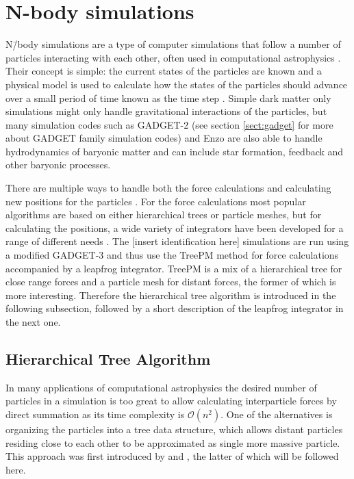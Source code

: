 \documentclass[english, oneside]{HYgradu}
\begin{document}
\section{N-body simulations}
N\=/body simulations are a type of computer simulations that follow a number of particles interacting with each other, often used in computational astrophysics \citep{binney2008galactic}. Their concept is simple: the current states of the particles are known and a physical model is used to calculate how the states of the particles should advance over a small period of time known as the time step \citep{binney2008galactic}. Simple dark matter only simulations might only handle gravitational interactions of the particles, but many simulation codes such as GADGET-2 \citep{springel2005cosmological} (see section \ref{sect:gadget} for more about GADGET family simulation codes) and Enzo \citep{norman2007simulating} are also able to handle hydrodynamics of baryonic matter and can include star formation, feedback and other baryonic processes.

There are multiple ways to handle both the force calculations and calculating new positions for the particles \citep{binney2008galactic}. For the force calculations most popular algorithms are based on either hierarchical trees or particle meshes, but for calculating the positions, a wide variety of integrators have been developed for a range of different needs \citep{binney2008galactic}. The [insert identification here] %
simulations are run using a modified GADGET-3 and thus use the TreePM method for force calculations accompanied by a leapfrog integrator. TreePM is a mix of a hierarchical tree for close range forces and a particle mesh for distant forces, the former of which is more interesting. Therefore the \citet{barnes1986hierarchical} hierarchical tree algorithm is introduced in the following subsection, followed by a short description of the leapfrog integrator in the next one.

\subsection{Hierarchical Tree Algorithm} \label{sect:tree}
In many applications of computational astrophysics the desired number of particles in a simulation is too great to allow calculating interparticle forces by direct summation as its time complexity is $\mathcal{O}(n^2)$. One of the alternatives is organizing the particles into a tree data structure, which allows distant particles residing close to each other to be approximated as single more massive particle. This approach was first introduced by \citet{appel1985efficient} and \citet{barnes1986hierarchical}, the latter of which will be followed here.
\end{document}
